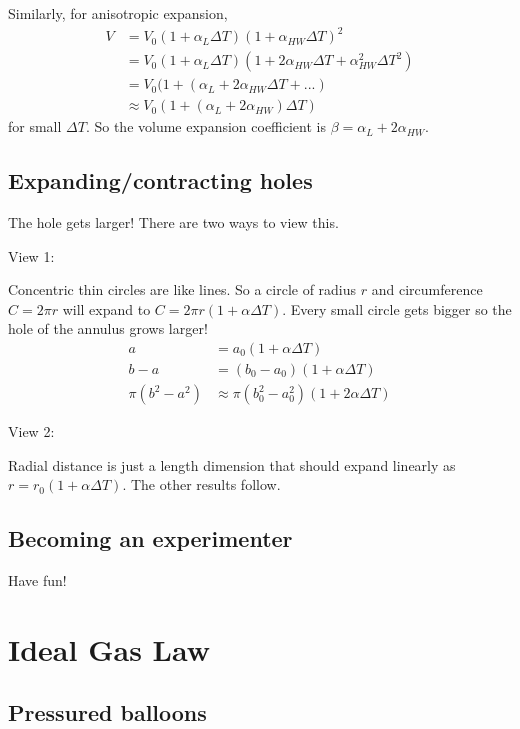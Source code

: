 \documentclass{article}
\begin{document}
Similarly, for anisotropic expansion,
\begin{align*}
V &= V_0(1+\alpha_L\Delta T)(1 + \alpha_{HW}\Delta T)^2 \\
&= V_0(1+\alpha_L\Delta T)(1+2\alpha_{HW}\Delta T + \alpha^2_{HW}\Delta T^2) \\
&= V_0(1+(\alpha_L + 2\alpha_{HW}\Delta T + ...) \\
&\approx V_0(1+(\alpha_L + 2\alpha_{HW})\Delta T)
\end{align*}
for small $\Delta T$. So the volume expansion coefficient is $\beta = \alpha_L + 2\alpha_{HW}$.

\subsection{Expanding/contracting holes}

The hole gets larger! There are two ways to view this.

View 1:

Concentric thin circles are like lines. So a circle of radius $r$ and circumference $C=2\pi r$ will expand to $C=2\pi r(1+\alpha\Delta T)$. Every small circle gets bigger so the hole of the annulus grows larger!
\begin{align*}
a &= a_0(1+\alpha\Delta T) \\
b - a &= (b_0-a_0)(1+\alpha\Delta T) \\
\pi(b^2-a^2) &\approx \pi(b_0^2-a_0^2)(1+2\alpha\Delta T)
\end{align*}

View 2:

Radial distance is just a length dimension that should expand linearly as $r=r_0(1+\alpha\Delta T)$. The other results follow.

\subsection{Becoming an experimenter}

Have fun!

\newpage

\section{Ideal Gas Law}

\subsection{Pressured balloons}
\end{document}
